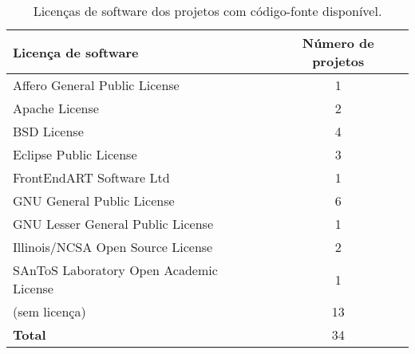 \begin{table}[h]
\caption{Licenças de software dos projetos com código-fonte disponível.}
\centering
\begin{tabular}{l c}
  \hline
  {\bf Licença de software} & {\bf Número de projetos} \\
  \hline
  Affero General Public License & 1 \\
  Apache License & 2 \\
  BSD License & 4 \\
  Eclipse Public License & 3 \\
  FrontEndART Software Ltd & 1 \\
  GNU General Public License & 6 \\
  GNU Lesser General Public License & 1 \\
  Illinois/NCSA Open Source License & 2 \\
  SAnToS Laboratory Open Academic License & 1 \\
  (sem licença) & 13 \\
  \hline
  {\bf Total} & 34 \\
  \hline
\end{tabular}
\label{license-table}
\end{table}
